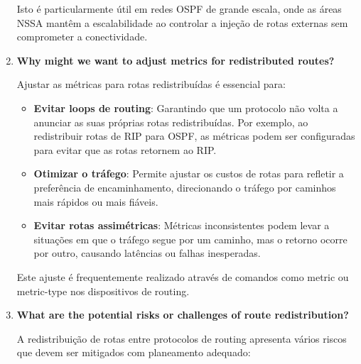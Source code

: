 \documentclass[11pt,english, openright, oneside]{book}
\begin{document}
\begin{enumerate}
  Isto é particularmente útil em redes OSPF de grande escala, onde as áreas NSSA mantêm a escalabilidade ao controlar a injeção de rotas externas sem comprometer a conectividade.
  \vspace{0.2cm}

  \newpage
  \item \textbf{Why might we want to adjust metrics for redistributed routes?}
  \vspace{0.2cm}

  \par Ajustar as métricas para rotas redistribuídas é essencial para:
  \vspace{0.2cm}

  \begin{itemize}
    \item \textbf{Evitar loops de routing}: Garantindo que um protocolo não volta a anunciar as suas próprias rotas redistribuídas. Por exemplo, ao redistribuir rotas de RIP para OSPF, as métricas podem ser configuradas para evitar que as rotas retornem ao RIP.
    \item \textbf{Otimizar o tráfego}: Permite ajustar os custos de rotas para refletir a preferência de encaminhamento, direcionando o tráfego por caminhos mais rápidos ou mais fiáveis.
    \item \textbf{Evitar rotas assimétricas}: Métricas inconsistentes podem levar a situações em que o tráfego segue por um caminho, mas o retorno ocorre por outro, causando latências ou falhas inesperadas.
  \end{itemize}
  \vspace{0.2cm}

  Este ajuste é frequentemente realizado através de comandos como metric ou metric-type nos dispositivos de routing.
  \vspace{0.2cm}

  \item \textbf{What are the potential risks or challenges of route redistribution?}
  \vspace{0.2cm}

  \par A redistribuição de rotas entre protocolos de routing apresenta vários riscos que devem ser mitigados com planeamento adequado:
  \vspace{0.2cm}


\end{enumerate}
\end{document}
